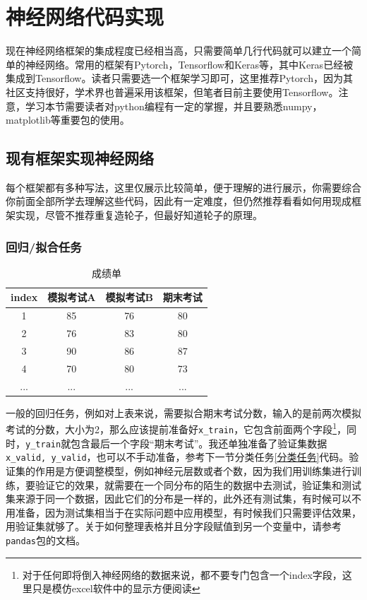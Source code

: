 \documentclass[a5paper, 11pt]{ctexbook}
\begin{document}
\section{神经网络代码实现}

现在神经网络框架的集成程度已经相当高，只需要简单几行代码就可以建立一个简单的神经网络。常用的框架有Pytorch，Tensorflow和Keras等，其中Keras已经被集成到Tensorflow。读者只需要选一个框架学习即可，这里推荐Pytorch，因为其社区支持很好，学术界也普遍采用该框架，但笔者目前主要使用Tensorflow。注意，学习本节需要读者对python编程有一定的掌握，并且要熟悉numpy，matplotlib等重要包的使用。

\subsection{现有框架实现神经网络}

每个框架都有多种写法，这里仅展示比较简单，便于理解的进行展示，你需要综合你前面全部所学去理解这些代码，因此有一定难度，但仍然推荐看看如何用现成框架实现，尽管不推荐重复造轮子，但最好知道轮子的原理。

\subsubsection{回归/拟合任务}

\begin{table}[ht]
    \centering
    \caption{成绩单}
    \begin{tabular}{c c c c}
        index & 模拟考试A & 模拟考试B & 期末考试 \\ \hline
        1     & 85    & 76    & 80   \\
        2     & 76    & 83    & 80   \\
        3     & 90    & 86    & 87   \\
        4     & 70    & 80    & 73   \\
        ...   & ...   & ...   & ...
    \end{tabular}
\end{table}

一般的回归任务，例如对上表来说，需要拟合期末考试分数，输入的是前两次模拟考试的分数，大小为2，那么应该提前准备好\verb|x_train|，它包含前面两个字段\footnote{对于任何即将倒入神经网络的数据来说，都不要专门包含一个index字段，这里只是模仿excel软件中的显示方便阅读}，同时，\verb|y_train|就包含最后一个字段“期末考试”。我还单独准备了验证集数据\verb|x_valid, y_valid|，也可以不手动准备，参考下一节分类任务\ref{分类任务}代码。验证集的作用是方便调整模型，例如神经元层数或者个数，因为我们用训练集进行训练，要验证它的效果，就需要在一个同分布的陌生的数据中去测试，验证集和测试集来源于同一个数据，因此它们的分布是一样的，此外还有测试集，有时候可以不用准备，因为测试集相当于在实际问题中应用模型，有时候我们只需要评估效果，用验证集就够了。关于如何整理表格并且分字段赋值到另一个变量中，请参考\verb|pandas|包的文档。
\end{document}
